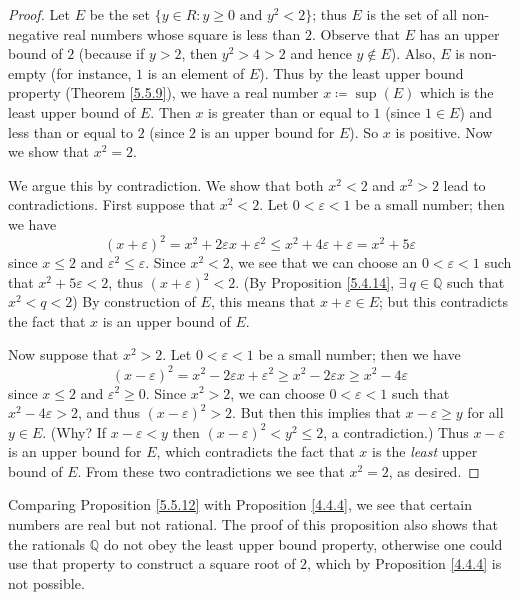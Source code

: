 \begin{proof}
Let \(E\) be the set \(\{y \in R : y \geq 0 \text{ and } y^2 < 2\}\);
thus \(E\) is the set of all non-negative real numbers whose square is less than \(2\).
Observe that \(E\) has an upper bound of \(2\) (because if \(y > 2\), then \(y^2 > 4 > 2\) and hence \(y \notin E\)).
Also, \(E\) is non-empty (for instance, \(1\) is an element of \(E\)).
Thus by the least upper bound property (Theorem \ref{5.5.9}), we have a real number \(x \coloneqq \sup(E)\) which is the least upper bound of \(E\).
Then \(x\) is greater than or equal to \(1\) (since \(1 \in E\)) and less than or equal to \(2\)
(since \(2\) is an upper bound for \(E\)).
So \(x\) is positive.
Now we show that \(x^2 = 2\).

We argue this by contradiction.
We show that both \(x^2 < 2\) and \(x^2 > 2\) lead to contradictions.
First suppose that \(x^2 < 2\).
Let \(0 < \varepsilon < 1\) be a small number;
then we have
\[
    (x + \varepsilon)^2 = x^2 + 2\varepsilon x + \varepsilon^2 \leq x^2 + 4\varepsilon + \varepsilon = x^2 + 5\varepsilon
\]
since \(x \leq 2\) and \(\varepsilon^2 \leq \varepsilon\).
Since \(x^2 < 2\), we see that we can choose an \(0 < \varepsilon < 1\) such that \(x^2 + 5\varepsilon < 2\), thus \((x + \varepsilon)^2 < 2\).
(By Proposition \ref{5.4.14}, \(\exists\ q \in \mathds{Q}\) such that \(x^2 < q < 2\))
By construction of \(E\), this means that \(x + \varepsilon \in E\);
but this contradicts the fact that \(x\) is an upper bound of \(E\).

Now suppose that \(x^2 > 2\).
Let \(0 < \varepsilon < 1\) be a small number;
then we have
\[
    (x - \varepsilon)^2 = x^2 - 2\varepsilon x + \varepsilon^2 \geq x^2 - 2\varepsilon x \geq x^2 - 4\varepsilon
\]
since \(x \leq 2\) and \(\varepsilon^2 \geq 0\).
Since \(x^2 > 2\), we can choose \(0 < \varepsilon < 1\) such that \(x^2 - 4\varepsilon > 2\), and thus \((x - \varepsilon)^2 > 2\).
But then this implies that \(x - \varepsilon \geq y\) for all \(y \in E\).
(Why? If \(x - \varepsilon < y\) then \((x - \varepsilon)^2 < y^2 \leq 2\), a contradiction.)
Thus \(x - \varepsilon\) is an upper bound for \(E\), which contradicts the fact that \(x\) is the \emph{least} upper bound of \(E\).
From these two contradictions we see that \(x^2 = 2\), as desired.
\end{proof}

\begin{remark}\label{5.5.13}
Comparing Proposition \ref{5.5.12} with Proposition \ref{4.4.4}, we see that certain numbers are real but not rational.
The proof of this proposition also shows that the rationals \(\mathds{Q}\) do not obey the least upper bound property, otherwise one could use that property to construct a square root of \(2\), which by Proposition \ref{4.4.4} is not possible.
\end{remark}

